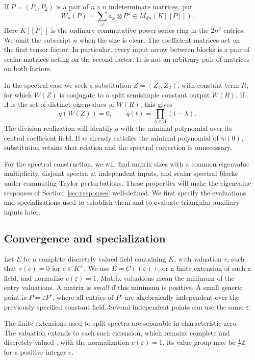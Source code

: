 \documentclass[11pt]{article}
\theoremstyle{definition}
\theoremstyle{remark}
\numberwithin{equation}{section}
\begin{document}
If $P=(P_1,P_2)$ is a pair of $n\times n$ indeterminate matrices, put
\[
 W_n(P)=\sum_\omega a_\omega\otimes P^\omega
       \in M_{dn}(K[[P]]).
\]
Here $K[[P]]$ is the ordinary commutative power series ring in the
$2n^2$ entries.  We omit the subscript $n$ when the size is clear.
The coefficient matrices act on the first tensor factor.  In
particular, every input arrow between blocks is a pair of scalar
matrices acting on the second factor.  It is not an arbitrary pair of
matrices on both factors.

In the spectral case we seek a substitution $Z=(Z_1,Z_2)$, with
constant term $R$, for which $W(Z)$ is conjugate to a split semisimple
constant output $W(R)$. If $\Lambda$ is the set of distinct eigenvalues
of $W(R)$, this gives
\[
 q(W(Z))=0,\qquad q(t)=\prod_{\lambda\in\Lambda}(t-\lambda).
\]
The division realization will identify $q$ with the minimal polynomial
over its central coefficient field. If $w$ already satisfies the
minimal polynomial of $w(0)$, substitution retains that relation and
the spectral correction is unnecessary.

For the spectral construction, we will find matrix sizes with a common
eigenvalue multiplicity, disjoint spectra at independent inputs, and
scalar spectral blocks under commuting Taylor perturbations. These
properties will make the eigenvalue responses of
Section~\ref{sec:responses} well-defined. We first specify the
evaluations and specializations used to establish them and to evaluate
triangular auxiliary inputs later.

\subsection{Convergence and specialization}\label{subsec:formal-conventions}

Let $E$ be a complete discretely valued field containing $K$, with
valuation $v$, such that $v(c)=0$ for $c\in K^\times$.  We use
$E=C((\varepsilon))$, or a finite extension of such a field, and
normalize $v(\varepsilon)=1$.  Matrix valuations mean the minimum of
the entry valuations.  A matrix is \emph{small} if this minimum is
positive.  A small generic point is
$P=\varepsilon P^\circ$, where all entries of $P^\circ$ are
algebraically independent over the previously specified constant
field.  Several independent points can use the same $\varepsilon$.

The finite extensions used to split spectra are separable in
characteristic zero. The valuation extends to each such extension,
which remains complete and discretely valued
\cite[Theorem~7.38 and Remark~7.43]{MilneANT}; with the normalization
$v(\varepsilon)=1$, its value group may be $\frac1e\mathbb Z$ for a
positive integer $e$.
\end{document}
